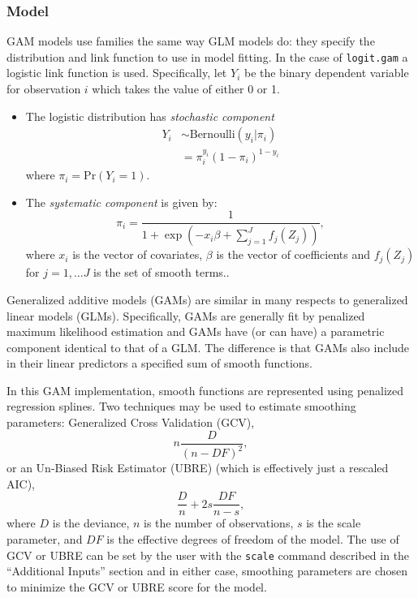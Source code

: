 \subsubsection{Model}


GAM models use families the same way GLM models do: they specify the distribution and link function to use in model fitting.  In the case of {\tt logit.gam} a logistic link function is used. Specifically, let $Y_{i}$ be the binary dependent variable for observation $i$ which takes the value of either 0 or 1.
\begin{itemize}
\item The logistic distribution has \emph{stochastic component}  
\begin{eqnarray*}
Y_{i} & \sim \text{Bernoulli} (y_{i} | \pi_{i})\\
& = \pi_{i}^{y_{i}} (1 - \pi_{i})^{1 - y_{i}}
\end{eqnarray*}
where $\pi_{i} = \text{Pr}(Y_{i} = 1)$.
\item The \emph{systematic component} is given by:
\begin{equation*}
\pi_{i} = \frac{1}{1 + \exp \left(-x_{i}\beta + \sum_{j=1}^{J} f_j(Z_j) \right)},
\end{equation*}
where $x_{i}$ is the vector of covariates, $\beta$ is the vector of coefficients and $f_j(Z_j)$ for $j=1, \ldots J$ is the set of smooth terms..
\end{itemize}

Generalized additive models (GAMs) are similar in many respects to generalized linear models (GLMs). Specifically, GAMs are generally fit by penalized maximum likelihood estimation and GAMs have (or can have) a parametric component identical to that of a GLM. The difference is that GAMs also include in their linear predictors a specified sum of smooth functions. 

In this GAM implementation, smooth functions are represented using penalized regression splines. Two techniques may be used to estimate smoothing parameters: Generalized Cross Validation (GCV),
\begin{equation}
n \frac{D}{(n-DF)^2},
\end{equation}
or an Un-Biased Risk Estimator (UBRE) (which is effectively just a rescaled AIC),
\begin{equation}
\frac{D}{n} + 2 s \frac{DF}{n-s},
\end{equation}
where $D$ is the deviance, $n$ is the number of observations, $s$ is the scale parameter, and $DF$ is the effective degrees of freedom of the model. The use of GCV or UBRE can be set by the user with the {\tt scale} command described in the ``Additional Inputs'' section and in either case, smoothing parameters are chosen to minimize the GCV or UBRE score for the model. 

